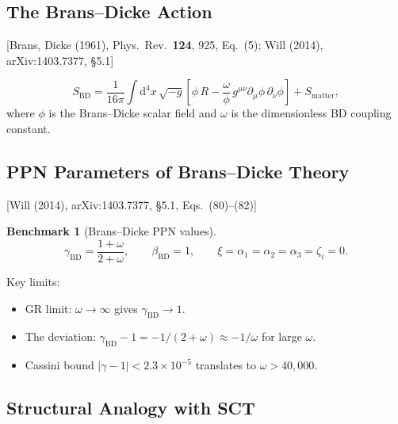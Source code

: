 \documentclass[11pt,a4paper]{article}
\theoremstyle{plain}
\theoremstyle{definition}
\newtheorem{benchmark}[theorem]{Benchmark}
\theoremstyle{remark}
\newcommand{\dd}{\mathrm{d}}
\newcommand{\fromlit}[1]{\textcolor{sctblue}{\textsf{[#1]}}}
\begin{document}
\subsection{The Brans--Dicke Action}

\fromlit{Brans, Dicke (1961), Phys.\ Rev.\ \textbf{124}, 925, Eq.~(5);
Will (2014), arXiv:1403.7377, \S5.1}

\begin{equation}\label{eq:BD-action}
  S_{\mathrm{BD}} = \frac{1}{16\pi}\int \dd^4 x\,\sqrt{-g}\left[
    \phi\, R - \frac{\omega}{\phi}\,
    g^{\mu\nu}\partial_\mu\phi\,\partial_\nu\phi
  \right] + S_{\mathrm{matter}},
\end{equation}
where $\phi$ is the Brans--Dicke scalar field and $\omega$ is the
dimensionless BD coupling constant.

\subsection{PPN Parameters of Brans--Dicke Theory}

\fromlit{Will (2014), arXiv:1403.7377, \S5.1, Eqs.~(80)--(82)}

\begin{benchmark}[Brans--Dicke PPN values]\label{bench:BD-ppn}
\begin{equation}\label{eq:gamma-BD}
  \gamma_{\mathrm{BD}} = \frac{1 + \omega}{2 + \omega},
  \qquad
  \beta_{\mathrm{BD}} = 1,
  \qquad
  \xi = \alpha_1 = \alpha_2 = \alpha_3 = \zeta_i = 0.
\end{equation}
\end{benchmark}

\noindent Key limits:
\begin{itemize}[nosep]
  \item GR limit: $\omega \to \infty$ gives $\gamma_{\mathrm{BD}} \to 1$.
  \item The deviation: $\gamma_{\mathrm{BD}} - 1
    = -1/(2 + \omega) \approx -1/\omega$ for large $\omega$.
  \item Cassini bound $|\gamma - 1| < 2.3\times 10^{-5}$ translates to
    $\omega > 40{,}000$.
\end{itemize}

\subsection{Structural Analogy with SCT}
\end{document}
